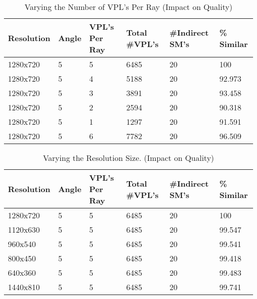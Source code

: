 \begin{table}[h!]
	\caption{Varying the Number of VPL's Per Ray (Impact on Quality)}
	\begin{center}
	    \begin{tabular}{ | l | l | l | l | l | l |}
	    \hline
	    Resolution & Angle & VPL's Per Ray & Total \#VPL's & \#Indirect SM's & \% Similar\\ \hline
	    1280x720 & 5 & 5 & 6485 & 20 & 100\\ \hline
	    1280x720 & 5 & 4 & 5188 & 20 & 92.973\\ \hline
	    1280x720 & 5 & 3 & 3891 & 20 & 93.458\\ \hline
	    1280x720 & 5 & 2 & 2594 & 20 & 90.318\\ \hline
	    1280x720 & 5 & 1 & 1297 & 20 & 91.591\\ \hline
	    1280x720 & 5 & 6 & 7782 & 20 & 96.509\\ \hline
	    \end{tabular}
	\end{center}
	\label{table:5.6}
\end{table}

\begin{table}[h!]
	\caption{Varying the Resolution Size. (Impact on Quality)}
	\begin{center}
	    \begin{tabular}{ | l | l | l | l | l | l |}
	    \hline
	    Resolution & Angle & VPL's Per Ray & Total \#VPL's & \#Indirect SM's & \% Similar\\ \hline
	    1280x720 & 5 & 5 & 6485 & 20 & 100\\ \hline
	    1120x630 & 5 & 5 & 6485 & 20 & 99.547\\ \hline
	    960x540 & 5 & 5 & 6485 & 20 & 99.541\\ \hline
	    800x450 & 5 & 5 & 6485 & 20 & 99.418\\ \hline
	    640x360 & 5 & 5 & 6485 & 20 & 99.483\\ \hline
	    1440x810 & 5 & 5 & 6485 & 20 & 99.741\\ \hline
	    \end{tabular}
	\end{center}
	\label{table:5.7}
\end{table}

